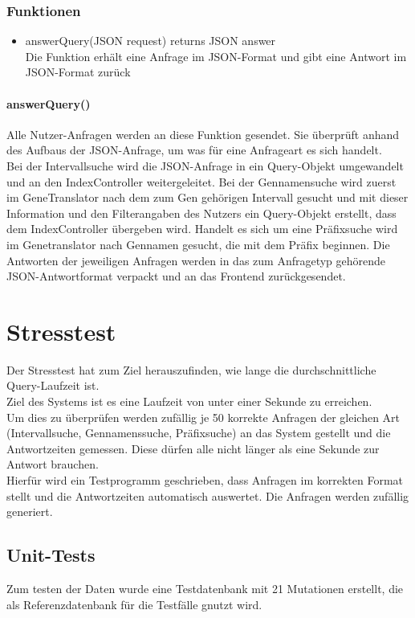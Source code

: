 \subsubsection{Funktionen}
\begin{itemize}
\item answerQuery(JSON request) returns JSON answer\\
Die Funktion erhält eine Anfrage im JSON-Format und gibt eine Antwort im JSON-Format zurück
\end{itemize}
\paragraph{answerQuery()}
Alle Nutzer-Anfragen werden an diese Funktion gesendet. Sie überprüft anhand des Aufbaus der JSON-Anfrage, um was für eine Anfrageart es sich handelt.\\ Bei der Intervallsuche wird die JSON-Anfrage in ein Query-Objekt umgewandelt und an den IndexController weitergeleitet. Bei der Gennamensuche wird zuerst im GeneTranslator nach dem zum Gen gehörigen Intervall gesucht und mit dieser Information und den Filterangaben des Nutzers ein Query-Objekt erstellt, dass dem IndexController übergeben wird. Handelt es sich um eine Präfixsuche wird im Genetranslator nach Gennamen gesucht, die mit dem Präfix beginnen. Die Antworten der jeweiligen Anfragen werden in das zum Anfragetyp gehörende JSON-Antwortformat verpackt und an das Frontend zurückgesendet.\\

\newpage
\section{Stresstest}
Der Stresstest hat zum Ziel herauszufinden, wie lange die durchschnittliche Query-Laufzeit ist.\\
Ziel des Systems ist es eine Laufzeit von unter einer Sekunde zu erreichen.\\
Um dies zu überprüfen werden zufällig je 50 korrekte Anfragen der gleichen Art (Intervallsuche, Gennamenssuche, Präfixsuche) an das System gestellt und die Antwortzeiten gemessen. Diese dürfen alle nicht länger als eine Sekunde zur Antwort brauchen.\\
Hierfür wird ein Testprogramm geschrieben, dass Anfragen im korrekten Format stellt und die Antwortzeiten automatisch auswertet. Die Anfragen werden zufällig generiert.

\newpage
\subsection{Unit-Tests}
Zum testen der Daten wurde eine Testdatenbank mit 21 Mutationen erstellt, die als Referenzdatenbank für die Testfälle gnutzt wird.
